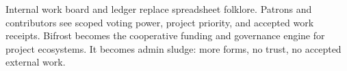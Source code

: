 \ProjectionBand
{Internal work board and ledger replace spreadsheet folklore.}
{Patrons and contributors see scoped voting power, project priority, and accepted work receipts.}
{Bifrost becomes the cooperative funding and governance engine for project ecosystems.}
{It becomes admin sludge: more forms, no trust, no accepted external work.}

